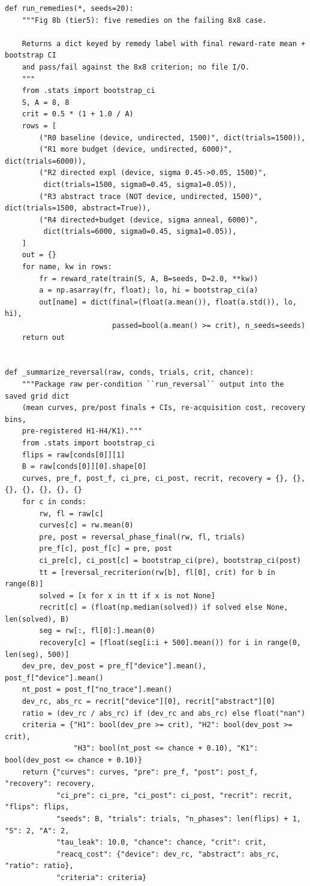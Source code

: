 \begin{lstlisting}[caption={mrl\_trace/bandit.py},label={lst:siox-src-bandit}]
def run_remedies(*, seeds=20):
    """Fig 8b (tier5): five remedies on the failing 8x8 case.

    Returns a dict keyed by remedy label with final reward-rate mean + bootstrap CI
    and pass/fail against the 8x8 criterion; no file I/O.
    """
    from .stats import bootstrap_ci
    S, A = 8, 8
    crit = 0.5 * (1 + 1.0 / A)
    rows = [
        ("R0 baseline (device, undirected, 1500)", dict(trials=1500)),
        ("R1 more budget (device, undirected, 6000)", dict(trials=6000)),
        ("R2 directed expl (device, sigma 0.45->0.05, 1500)",
         dict(trials=1500, sigma0=0.45, sigma1=0.05)),
        ("R3 abstract trace (NOT device, undirected, 1500)", dict(trials=1500, abstract=True)),
        ("R4 directed+budget (device, sigma anneal, 6000)",
         dict(trials=6000, sigma0=0.45, sigma1=0.05)),
    ]
    out = {}
    for name, kw in rows:
        fr = reward_rate(train(S, A, B=seeds, D=2.0, **kw))
        a = np.asarray(fr, float); lo, hi = bootstrap_ci(a)
        out[name] = dict(final=(float(a.mean()), float(a.std()), lo, hi),
                         passed=bool(a.mean() >= crit), n_seeds=seeds)
    return out


def _summarize_reversal(raw, conds, trials, crit, chance):
    """Package raw per-condition ``run_reversal`` output into the saved grid dict
    (mean curves, pre/post finals + CIs, re-acquisition cost, recovery bins,
    pre-registered H1-H4/K1)."""
    from .stats import bootstrap_ci
    flips = raw[conds[0]][1]
    B = raw[conds[0]][0].shape[0]
    curves, pre_f, post_f, ci_pre, ci_post, recrit, recovery = {}, {}, {}, {}, {}, {}, {}
    for c in conds:
        rw, fl = raw[c]
        curves[c] = rw.mean(0)
        pre, post = reversal_phase_final(rw, fl, trials)
        pre_f[c], post_f[c] = pre, post
        ci_pre[c], ci_post[c] = bootstrap_ci(pre), bootstrap_ci(post)
        tt = [reversal_recriterion(rw[b], fl[0], crit) for b in range(B)]
        solved = [x for x in tt if x is not None]
        recrit[c] = (float(np.median(solved)) if solved else None, len(solved), B)
        seg = rw[:, fl[0]:].mean(0)
        recovery[c] = [float(seg[i:i + 500].mean()) for i in range(0, len(seg), 500)]
    dev_pre, dev_post = pre_f["device"].mean(), post_f["device"].mean()
    nt_post = post_f["no_trace"].mean()
    dev_rc, abs_rc = recrit["device"][0], recrit["abstract"][0]
    ratio = (dev_rc / abs_rc) if (dev_rc and abs_rc) else float("nan")
    criteria = {"H1": bool(dev_pre >= crit), "H2": bool(dev_post >= crit),
                "H3": bool(nt_post <= chance + 0.10), "K1": bool(dev_post <= chance + 0.10)}
    return {"curves": curves, "pre": pre_f, "post": post_f, "recovery": recovery,
            "ci_pre": ci_pre, "ci_post": ci_post, "recrit": recrit, "flips": flips,
            "seeds": B, "trials": trials, "n_phases": len(flips) + 1, "S": 2, "A": 2,
            "tau_leak": 10.0, "chance": chance, "crit": crit,
            "reacq_cost": {"device": dev_rc, "abstract": abs_rc, "ratio": ratio},
            "criteria": criteria}



\end{lstlisting}
